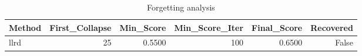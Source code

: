\begin{table}[htbp]
\centering
\caption{Forgetting analysis}
\label{tab:forgetting}
\begin{tabular}{lrrrrr}
\toprule
\textbf{Method} & \textbf{First\_Collapse} & \textbf{Min\_Score} & \textbf{Min\_Score\_Iter} & \textbf{Final\_Score} & \textbf{Recovered} \\
\midrule
llrd & 25 & 0.5500 & 100 & 0.6500 & False \\
\bottomrule
\end{tabular}
\end{table}